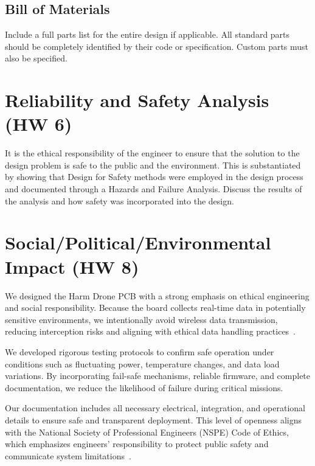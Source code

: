 \documentclass[12pt]{article}
\begin{document}
\subsection{Bill of Materials}
Include a full parts list for the entire design if applicable. All standard parts should be completely identified by their code or specification. Custom parts must also be specified.

\section{Reliability and Safety Analysis (HW 6)}
It is the ethical responsibility of the engineer to ensure that the solution to the design problem is safe to the public and the environment. This is substantiated by showing that Design for Safety methods were employed in the design process and documented through a Hazards and Failure Analysis. Discuss the results of the analysis and how safety was incorporated into the design.

\section{Social/Political/Environmental Impact (HW 8)}

We designed the Harm Drone PCB with a strong emphasis on ethical engineering and social responsibility. Because the board collects real-time data in potentially sensitive environments, we intentionally avoid wireless data transmission, reducing interception risks and aligning with ethical data handling practices~\cite{parrot2023,microchip2023}.

We developed rigorous testing protocols to confirm safe operation under conditions such as fluctuating power, temperature changes, and data load variations. By incorporating fail-safe mechanisms, reliable firmware, and complete documentation, we reduce the likelihood of failure during critical missions.

Our documentation includes all necessary electrical, integration, and operational details to ensure safe and transparent deployment. This level of openness aligns with the National Society of Professional Engineers (NSPE) Code of Ethics, which emphasizes engineers' responsibility to protect public safety and communicate system limitations~\cite{nspe}.
\end{document}
